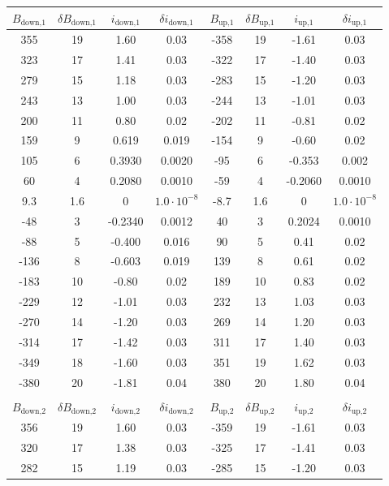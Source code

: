 \begin{table}
\centering \small
\begin{tabular}{cccccccc}
$B_\text{down,1}$ & $\delta B_\text{down,1}$ & $i_\text{down,1}$ & $\delta i_\text{down,1}$ & $B_\text{up,1}$ & $\delta B_\text{up,1}$ & $i_\text{up,1}$ & $\delta i_\text{up,1}$ \\ \hline
355 & 19 & 1.60 & 0.03 & -358 & 19 & -1.61 & 0.03\\
323 & 17 & 1.41 & 0.03 & -322 & 17 & -1.40 & 0.03\\
279 & 15 & 1.18 & 0.03 & -283 & 15 & -1.20 & 0.03\\
243 & 13 & 1.00 & 0.03 & -244 & 13 & -1.01 & 0.03\\
200 & 11 & 0.80 & 0.02 & -202 & 11 & -0.81 & 0.02\\
159 & 9 & 0.619 & 0.019 & -154 & 9 & -0.60 & 0.02\\
105 & 6 & 0.3930 & 0.0020 & -95 & 6 & -0.353 & 0.002\\
60 & 4 & 0.2080 & 0.0010 & -59 & 4 & -0.2060 & 0.0010\\
9.3 & 1.6 & 0 & $ 1.0 \cdot 10^{-8} $ & -8.7 & 1.6 & 0 & $ 1.0 \cdot 10^{-8} $ \\
-48 & 3 & -0.2340 & 0.0012 & 40 & 3 & 0.2024 & 0.0010\\
-88 & 5 & -0.400 & 0.016 & 90 & 5 & 0.41 & 0.02\\
-136 & 8 & -0.603 & 0.019 & 139 & 8 & 0.61 & 0.02\\
-183 & 10 & -0.80 & 0.02 & 189 & 10 & 0.83 & 0.02\\
-229 & 12 & -1.01 & 0.03 & 232 & 13 & 1.03 & 0.03\\
-270 & 14 & -1.20 & 0.03 & 269 & 14 & 1.20 & 0.03\\
-314 & 17 & -1.42 & 0.03 & 311 & 17 & 1.40 & 0.03\\
-349 & 18 & -1.60 & 0.03 & 351 & 19 & 1.62 & 0.03\\
-380 & 20 & -1.81 & 0.04 & 380 & 20 & 1.80 & 0.04\\
     &&&&&&& \\
$B_\text{down,2}$ & $\delta B_\text{down,2}$ & $i_\text{down,2}$ & $\delta i_\text{down,2}$ & $B_\text{up,2}$ & $\delta B_\text{up,2}$ & $i_\text{up,2}$ & $\delta i_\text{up,2}$ \\ \hline
356 & 19 & 1.60 & 0.03 & -359 & 19 & -1.61 & 0.03\\
320 & 17 & 1.38 & 0.03 & -325 & 17 & -1.41 & 0.03\\
282 & 15 & 1.19 & 0.03 & -285 & 15 & -1.20 & 0.03\\

\end{tabular}
\end{table}

